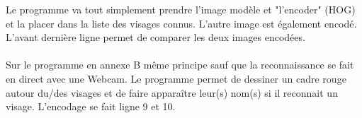 Le programme va tout simplement prendre l'image modèle et "l'encoder" (HOG) et
la placer dans la liste des visages connus. L'autre image est également
encodé. L'avant dernière ligne permet de comparer les deux images encodées.
\\
\\
Sur le programme en annexe B même principe sauf que la reconnaissance se fait en direct
avec une Webcam. Le programme permet de dessiner un cadre rouge autour du/des
visages et de faire apparaître leur(s) nom(s) si il reconnait un visage.
L'encodage se fait ligne 9 et 10.
\newpage
